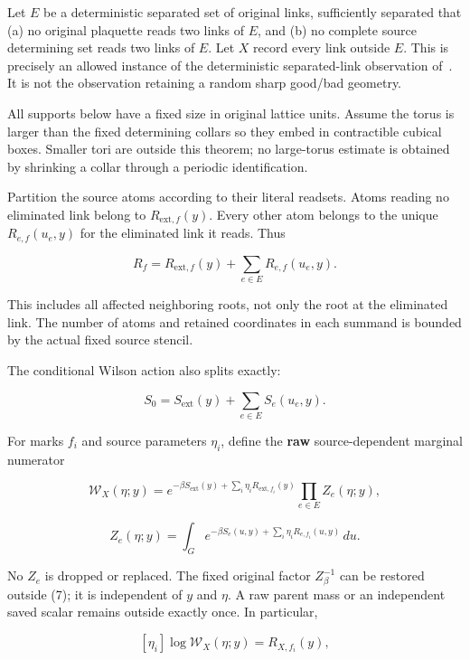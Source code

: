 \documentclass[
  11pt,
]{article}
\begin{document}
Let \(E\) be a deterministic separated set of original links,
sufficiently separated that (a) no original plaquette reads two links of
\(E\), and (b) no complete source determining set reads two links of
\(E\). Let \(X\) record every link outside \(E\). This is precisely an
allowed instance of the deterministic separated-link
observation of~\cite{CT}. It is not the observation retaining a random sharp good/bad
geometry.

All supports below have a fixed size in original lattice units. Assume
the torus is larger than the fixed determining collars so they embed in
contractible cubical boxes. Smaller tori are outside this theorem; no
large-torus estimate is obtained by shrinking a collar through a
periodic identification.

Partition the source atoms according to their literal readsets. Atoms
reading no eliminated link belong to \(R_{\mathrm{ext},f}(y)\). Every
other atom belongs to the unique \(R_{e,f}(u_e,y)\) for the eliminated
link it reads. Thus

\[
 R_f=R_{\mathrm{ext},f}(y)+\sum_{e\in E}R_{e,f}(u_e,y).
                                                        \tag{5}
\]

This includes all affected neighboring roots, not only the root at the
eliminated link. The number of atoms and retained coordinates in each
summand is bounded by the actual fixed source stencil.

The conditional Wilson action also splits exactly:

\[
 S_0=S_{\mathrm{ext}}(y)+\sum_{e\in E}S_e(u_e,y).
                                                        \tag{6}
\]

For marks \(f_i\) and source parameters \(\eta_i\), define the
\textbf{raw} source-dependent marginal numerator

\[
 \mathcal W_X(\eta;y)
 =e^{-\beta S_{\mathrm{ext}}(y)+\sum_i\eta_iR_{\mathrm{ext},f_i}(y)}
 \prod_{e\in E} Z_e(\eta;y),
\]

\[
 Z_e(\eta;y)
 =\int_G e^{-\beta S_e(u,y)+\sum_i\eta_iR_{e,f_i}(u,y)}\,du.
                                                        \tag{7}
\]

No \(Z_e\) is dropped or replaced. The fixed original factor
\(Z_\beta^{-1}\) can be restored outside (7); it is independent of \(y\)
and \(\eta\). A raw parent mass or an independent saved scalar remains
outside exactly once. In particular,

\[
 [\eta_i]\log\mathcal W_X(\eta;y)=R_{X,f_i}(y),
                                                        \tag{8}
\]
\end{document}
